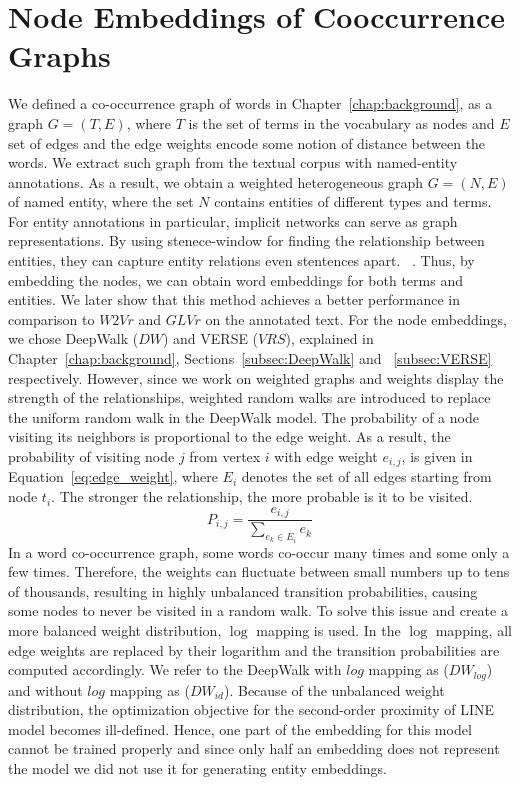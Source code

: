 \section{Node Embeddings of Cooccurrence Graphs}\label{sec:graph_based}
We defined a co-occurrence graph of words in Chapter~\ref{chap:background}, as a graph $G=(T,E)$, where $T$ is the set of terms in the vocabulary as nodes and $E$ set of edges and the edge weights encode some notion of distance between the words. We extract such graph from the textual corpus with named-entity annotations. As a result, we obtain a weighted heterogeneous graph $G=(N,E)$ of named entity, where the set $N$ contains entities of different types and terms. For entity annotations in particular, implicit networks can serve as graph representations. By using stenece-window for finding the relationship between entities, they can capture entity relations even stentences apart. ~. Thus, by embedding the nodes, we can obtain word embeddings for both terms and entities.  We later show that this method achieves a better performance in comparison to $W2Vr$ and $GLVr$ on the annotated text. For the node embeddings, we chose DeepWalk ($DW$) and VERSE ($VRS$), explained in Chapter~\ref{chap:background}, Sections~\ref{subsec:DeepWalk} and ~\ref{subsec:VERSE} respectively. However, since we work on weighted graphs and weights display the strength of the relationships, weighted random walks are introduced to replace the uniform random walk in the DeepWalk model. The probability of a node visiting its neighbors is proportional to the edge weight. As a result, the probability of visiting node $j$ from vertex $i$ with edge weight $e_{i,j}$,  is given in Equation~\ref{eq:edge_weight}, where $ E_{ i }$ denotes the set of all edges starting from node $t_{i}$. The stronger the relationship, the more probable is it to be visited. 
\begin{equation}
P_{i,j}=\frac{e_{i,j}}{\sum _{ e_{ k }\in E_{ i } }^{  }{ e_{k} } }
\label{eq:edge_weight}
\end{equation}
In a word co-occurrence
graph, some words co-occur many times and some only a few times. Therefore, the weights can fluctuate between small numbers up to tens of thousands, resulting in highly unbalanced transition probabilities, causing some nodes to never be visited in a random walk. To solve this issue and create a more balanced weight distribution, $ \log$ mapping is used. In the $\log$ mapping, all edge weights are replaced by their logarithm and the transition probabilities are computed accordingly. We refer to the DeepWalk with $log$ mapping as ($DW_{log}$) and without $log$ mapping as ($DW_{id}$). Because of the unbalanced weight distribution, the optimization objective for the second-order proximity of LINE model becomes ill-defined. Hence, one part of the embedding for this model cannot be trained properly and since only half an embedding does not represent the model we did not use it for generating entity embeddings. \\
